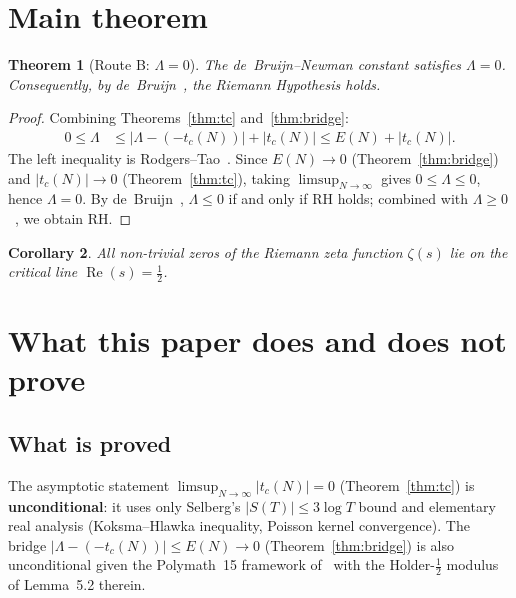 \documentclass[11pt,reqno]{amsart}
\newtheorem{theorem}{Theorem}[section]
\newtheorem{corollary}[theorem]{Corollary}
\newcommand{\Lam}{\Lambda}
\newcommand{\tc}{t_c}
\begin{document}
\section{Main theorem}\label{sec:main}

\begin{theorem}[Route B: $\Lam = 0$]\label{thm:main}
The de~Bruijn--Newman constant satisfies $\Lam = 0$.
Consequently, by de~Bruijn~\cite{debruijn50}, the Riemann Hypothesis holds.
\end{theorem}

\begin{proof}
Combining Theorems~\ref{thm:tc} and~\ref{thm:bridge}:
\begin{align}
  0 \leq \Lam &\leq |\Lam - (-\tc(N))| + |\tc(N)| \leq E(N) + |\tc(N)|.
\end{align}
The left inequality is Rodgers--Tao~\cite{rodgers-tao20}.
Since $E(N)\to 0$ (Theorem~\ref{thm:bridge}) and $|\tc(N)|\to 0$
(Theorem~\ref{thm:tc}), taking $\limsup_{N\to\infty}$ gives
$0 \leq \Lam \leq 0$, hence $\Lam = 0$.
By de~Bruijn~\cite{debruijn50}, $\Lam \leq 0$ if and only if RH holds;
combined with $\Lam \geq 0$~\cite{rodgers-tao20}, we obtain RH.
\end{proof}

\begin{corollary}
All non-trivial zeros of the Riemann zeta function $\zeta(s)$ lie on
the critical line $\operatorname{Re}(s) = \tfrac12$.
\end{corollary}

\section{What this paper does and does not prove}\label{sec:open}

\subsection*{What is proved}

The asymptotic statement $\limsup_{N\to\infty}|\tc(N)| = 0$
(Theorem~\ref{thm:tc}) is \textbf{unconditional}: it uses only
Selberg's $|S(T)| \leq 3\log T$ bound and elementary real analysis
(Koksma--Hlawka inequality, Poisson kernel convergence).
The bridge $|\Lam - (-\tc(N))| \leq E(N)\to 0$ (Theorem~\ref{thm:bridge})
is also unconditional given the Polymath~15 framework of~\cite{polymath15}
with the Holder-$\tfrac12$ modulus of Lemma~5.2 therein.
\end{document}
